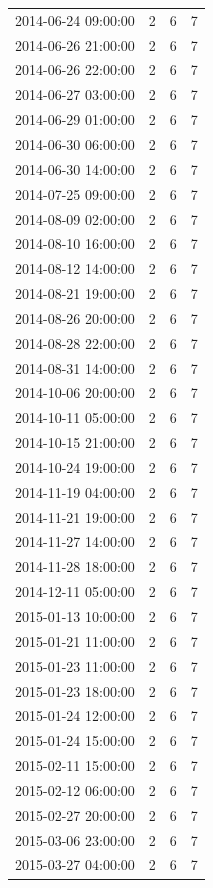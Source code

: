 \begin{tabular}{lrrr}
2014-06-24 09:00:00 & 2 & 6 & 7 \\
2014-06-26 21:00:00 & 2 & 6 & 7 \\
2014-06-26 22:00:00 & 2 & 6 & 7 \\
2014-06-27 03:00:00 & 2 & 6 & 7 \\
2014-06-29 01:00:00 & 2 & 6 & 7 \\
2014-06-30 06:00:00 & 2 & 6 & 7 \\
2014-06-30 14:00:00 & 2 & 6 & 7 \\
2014-07-25 09:00:00 & 2 & 6 & 7 \\
2014-08-09 02:00:00 & 2 & 6 & 7 \\
2014-08-10 16:00:00 & 2 & 6 & 7 \\
2014-08-12 14:00:00 & 2 & 6 & 7 \\
2014-08-21 19:00:00 & 2 & 6 & 7 \\
2014-08-26 20:00:00 & 2 & 6 & 7 \\
2014-08-28 22:00:00 & 2 & 6 & 7 \\
2014-08-31 14:00:00 & 2 & 6 & 7 \\
2014-10-06 20:00:00 & 2 & 6 & 7 \\
2014-10-11 05:00:00 & 2 & 6 & 7 \\
2014-10-15 21:00:00 & 2 & 6 & 7 \\
2014-10-24 19:00:00 & 2 & 6 & 7 \\
2014-11-19 04:00:00 & 2 & 6 & 7 \\
2014-11-21 19:00:00 & 2 & 6 & 7 \\
2014-11-27 14:00:00 & 2 & 6 & 7 \\
2014-11-28 18:00:00 & 2 & 6 & 7 \\
2014-12-11 05:00:00 & 2 & 6 & 7 \\
2015-01-13 10:00:00 & 2 & 6 & 7 \\
2015-01-21 11:00:00 & 2 & 6 & 7 \\
2015-01-23 11:00:00 & 2 & 6 & 7 \\
2015-01-23 18:00:00 & 2 & 6 & 7 \\
2015-01-24 12:00:00 & 2 & 6 & 7 \\
2015-01-24 15:00:00 & 2 & 6 & 7 \\
2015-02-11 15:00:00 & 2 & 6 & 7 \\
2015-02-12 06:00:00 & 2 & 6 & 7 \\
2015-02-27 20:00:00 & 2 & 6 & 7 \\
2015-03-06 23:00:00 & 2 & 6 & 7 \\
2015-03-27 04:00:00 & 2 & 6 & 7 \\

\end{tabular}
